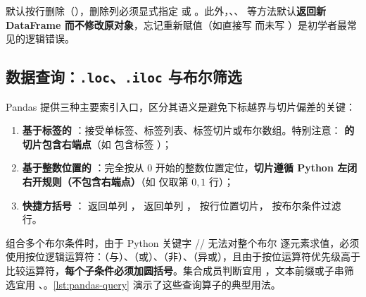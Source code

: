 \begin{pitfall}\label{pit:drop-default}
 默认按行删除（），删除列必须显式指定  或 。此外，、、 等方法默认\textbf{返回新 DataFrame 而不修改原对象}，忘记重新赋值（如直接写  而未写 ）是初学者最常见的逻辑错误。
\end{pitfall}

\subsection{数据查询：\texttt{.loc}、\texttt{.iloc} 与布尔筛选}

Pandas 提供三种主要索引入口，区分其语义是避免下标越界与切片偏差的关键：
\begin{enumerate}
  \item \textbf{基于标签的 }：接受单标签、标签列表、标签切片或布尔数组。特别注意：\textbf{ 的切片包含右端点}（如  包含标签 ）；
  \item \textbf{基于整数位置的 }：完全按从 $0$ 开始的整数位置定位，\textbf{切片遵循 Python 左闭右开规则（不包含右端点）}（如  仅取第 $0,1$ 行）；
  \item \textbf{快捷方括号 \lcinline{[]}}： 返回单列 ， 返回单列 ， 按行位置切片， 按布尔条件过滤行。
\end{enumerate}

组合多个布尔条件时，由于 Python 关键字 // 无法对整个布尔  逐元素求值，必须使用按位逻辑运算符：\lcinline{\&}（与）、\lcinline{|}（或）、\lcinline{\textasciitilde}（非）、\lcinline{\^{}}（异或），且由于按位运算符优先级高于比较运算符，\textbf{每个子条件必须加圆括号}。集合成员判断宜用 ，文本前缀或子串筛选宜用 、。\cref{lst:pandas-query} 演示了这些查询算子的典型用法。

